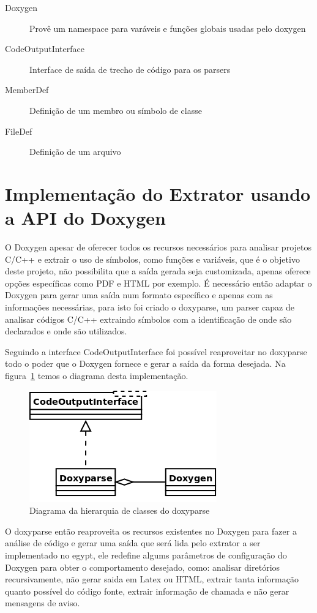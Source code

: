 \begin{description}
\item[Doxygen] Provê um namespace para varáveis e funções globais usadas pelo doxygen
\item[CodeOutputInterface] Interface de saída de trecho de código para os parsers
\item[MemberDef] Definição de um membro ou símbolo de classe
\item[FileDef] Definição de um arquivo
\end{description}

\section{Implementação do Extrator usando a API do Doxygen}

O Doxygen apesar de oferecer todos os recursos necessários para
analisar projetos C/C++ e extrair o uso de símbolos, como funções e variáveis,
que é o objetivo deste projeto, não possibilita que a saída gerada seja
customizada, apenas oferece opções específicas como PDF e HTML por exemplo. É
necessário então adaptar o Doxygen para gerar uma saída num formato
específico e apenas com as informações necessárias, para isto foi criado o
doxyparse, um parser capaz de analisar códigos C/C++ extraindo símbolos
com a identificação de onde são declarados e onde são utilizados.

Seguindo a interface CodeOutputInterface foi possível reaproveitar no doxyparse
todo o poder que o Doxygen fornece e gerar a saída da forma desejada. Na
figura~\ref{doxyparse-diagram} temos o diagrama desta implementação.

\begin{figure}[h]
\center
\includegraphics[scale=0.4]{imagens/doxyparse-diagram}
\caption{Diagrama da hierarquia de classes do doxyparse}
\label{doxyparse-diagram}
\end{figure}

O doxyparse então reaproveita os recursos existentes no Doxygen para fazer a
análise de código e gerar uma saída que será lida pelo extrator a ser
implementado no egypt, ele redefine algums parâmetros de configuração
do Doxygen para obter o comportamento desejado, como: analisar diretórios
recursivamente, não gerar saida em Latex ou HTML, extrair tanta informação
quanto possível do código fonte, extrair informação de chamada e não gerar
mensagens de aviso.

